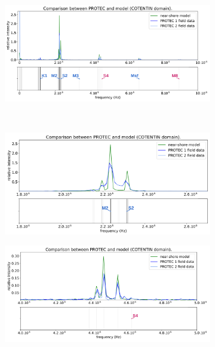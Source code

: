 \documentclass[10pt,a4paper,titlepage]{article}
\begin{document}
\begin{figure}[h!]
    \centering
    \begin{subfigure}{1.\linewidth}
        \centering
        \includegraphics[scale=0.4]{../images/post_traitement/COTENTIN_analyse_near-shore.pdf}
        \caption{}
    \end{subfigure}
    \\
    \begin{subfigure}{0.45\linewidth}
        \centering
        \includegraphics[scale=0.22]{../images/post_traitement/COTENTIN_analyse_near-shore_zoom1.pdf}
        \caption{}
    \end{subfigure}
    \begin{subfigure}{0.45\linewidth}
        \centering
        \includegraphics[scale=0.22]{../images/post_traitement/COTENTIN_analyse_near-shore_zoom2.pdf}

\end{subfigure}
\end{figure}
\end{document}
